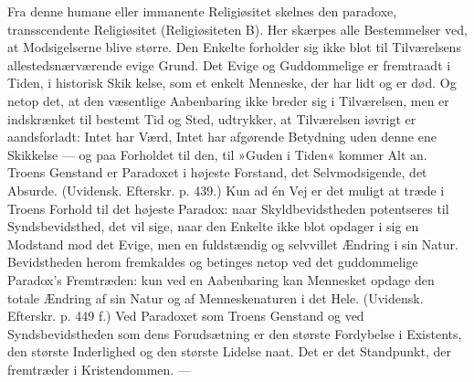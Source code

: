 \documentclass[12pt,a4paper,openany]{book}
\newcommand{\opage}[1]{\marginnote{\footnotesize\textit{[#1]}}}
\begin{document}
Fra denne humane eller immanente Religiøsitet skelnes
den paradoxe, transscendente Religiøsitet (Religiøsiteten
B). Her skærpes alle Bestemmelser ved, at Modsigelserne
blive større. Den Enkelte forholder sig ikke blot til Tilværelsens
allestedsnærværende evige Grund. Det Evige
og Guddommelige er fremtraadt i Tiden, i historisk Skik%
\opage{118}kelse, som et enkelt Menneske, der har lidt og er død.
Og netop det, at den væsentlige Aabenbaring ikke breder
sig i Tilværelsen, men er indskrænket til bestemt Tid
og Sted, udtrykker, at Tilværelsen iøvrigt er aandsforladt:
Intet har Værd, Intet har afgørende Betydning
uden denne ene Skikkelse --- og paa Forholdet til den,
til »Guden i Tiden« kommer Alt an. Troens Genstand
er Paradoxet i højeste Forstand, det Selvmodsigende, det
Absurde. (Uvidensk. Efterskr. p. 439.) Kun ad én Vej
er det muligt at træde i Troens Forhold til det højeste
Paradox: naar Skyldbevidstheden potentseres til Syndsbevidsthed,
det vil sige, naar den Enkelte ikke blot opdager
i sig en Modstand mod det Evige, men en fuldstændig
og selvvillet Ændring i sin Natur. Bevidstheden
herom fremkaldes og betinges netop ved det guddommelige
Paradox's Fremtræden: kun ved en Aabenbaring
kan Mennesket opdage den totale Ændring af sin Natur
og af Menneskenaturen i det Hele. (Uvidensk. Efterskr.
p. 449 f.) Ved Paradoxet som Troens Genstand og ved
Syndsbevidstheden som dens Forudsætning er den største
Fordybelse i Existents, den største Inderlighed og den
største Lidelse naat. Det er det Standpunkt, der fremtræder
i Kristendommen. ---
\end{document}
